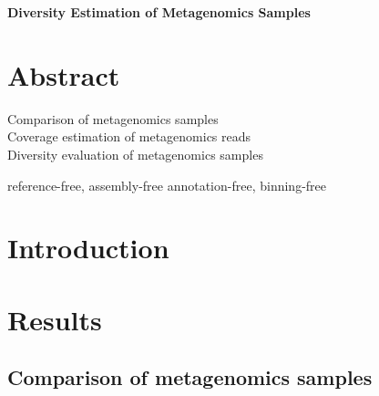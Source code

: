\documentclass[10pt]{article}
\date{}
\begin{document}
\begin{flushleft}
{\Large
\textbf{Diversity Estimation of Metagenomics Samples}
}
\end{flushleft}


\section*{Abstract}

Comparison of metagenomics samples
\\
Coverage estimation of metagenomics reads
\\
Diversity evaluation of metagenomics samples

reference-free, assembly-free annotation-free, binning-free



\section*{Introduction}

\section*{Results}

\subsection*{Comparison of metagenomics samples}
\end{document}
